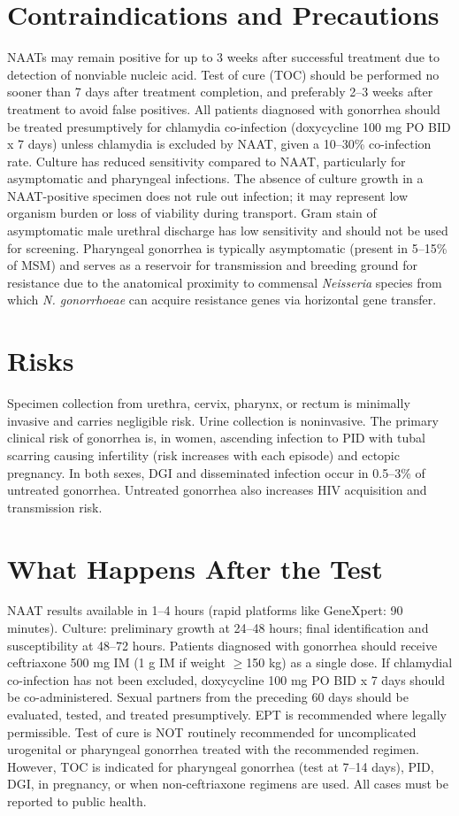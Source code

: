 \section*{Contraindications and Precautions}
NAATs may remain positive for up to 3 weeks after successful treatment due to detection of nonviable nucleic acid. Test of cure (TOC) should be performed no sooner than 7 days after treatment completion, and preferably 2--3 weeks after treatment to avoid false positives. All patients diagnosed with gonorrhea should be treated presumptively for chlamydia co-infection (doxycycline 100 mg PO BID x 7 days) unless chlamydia is excluded by NAAT, given a 10--30\% co-infection rate. Culture has reduced sensitivity compared to NAAT, particularly for asymptomatic and pharyngeal infections. The absence of culture growth in a NAAT-positive specimen does not rule out infection; it may represent low organism burden or loss of viability during transport. Gram stain of asymptomatic male urethral discharge has low sensitivity and should not be used for screening. Pharyngeal gonorrhea is typically asymptomatic (present in 5--15\% of MSM) and serves as a reservoir for transmission and breeding ground for resistance due to the anatomical proximity to commensal \textit{Neisseria} species from which \textit{N. gonorrhoeae} can acquire resistance genes via horizontal gene transfer.

\section*{Risks}
Specimen collection from urethra, cervix, pharynx, or rectum is minimally invasive and carries negligible risk. Urine collection is noninvasive. The primary clinical risk of gonorrhea is, in women, ascending infection to PID with tubal scarring causing infertility (risk increases with each episode) and ectopic pregnancy. In both sexes, DGI and disseminated infection occur in 0.5--3\% of untreated gonorrhea. Untreated gonorrhea also increases HIV acquisition and transmission risk.

\section*{What Happens After the Test}
NAAT results available in 1--4 hours (rapid platforms like GeneXpert: 90 minutes). Culture: preliminary growth at 24--48 hours; final identification and susceptibility at 48--72 hours. Patients diagnosed with gonorrhea should receive ceftriaxone 500 mg IM (1 g IM if weight $\geq$150 kg) as a single dose. If chlamydial co-infection has not been excluded, doxycycline 100 mg PO BID x 7 days should be co-administered. Sexual partners from the preceding 60 days should be evaluated, tested, and treated presumptively. EPT is recommended where legally permissible. Test of cure is NOT routinely recommended for uncomplicated urogenital or pharyngeal gonorrhea treated with the recommended regimen. However, TOC is indicated for pharyngeal gonorrhea (test at 7--14 days), PID, DGI, in pregnancy, or when non-ceftriaxone regimens are used. All cases must be reported to public health.

